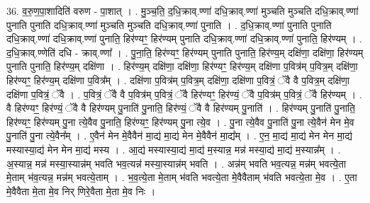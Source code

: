 \documentclass[17pt]{extarticle}
\begin{document}
36. व॒रु॒ण॒पा॒शादिति॑ वरुण - पा॒शात् । . मु॒ञ्च॒ति॒ द॒धि॒क्राव्.ण्णा॑ दधि॒क्राव्.ण्णा॑ मुञ्चति मुञ्चति दधि॒क्राव्.ण्णा॑ पुनाति पुनाति दधि॒क्राव्.ण्णा॑ मुञ्चति मुञ्चति दधि॒क्राव्.ण्णा॑ पुनाति । . द॒धि॒क्राव्.ण्णा॑ पुनाति पुनाति दधि॒क्राव्.ण्णा॑ दधि॒क्राव्.ण्णा॑ पुनाति॒ हिर॑ण्यꣳ॒॒ हिर॑ण्यम् पुनाति दधि॒क्राव्.ण्णा॑ दधि॒क्राव्.ण्णा॑ पुनाति॒ हिर॑ण्यम् । . द॒धि॒क्राव्.ण्णेति॑ दधि - क्राव्.ण्णा᳚ । . पु॒ना॒ति॒ हिर॑ण्यꣳ॒॒ हिर॑ण्यम् पुनाति पुनाति॒ हिर॑ण्य॒म् दक्षि॑णा॒ दक्षि॑णा॒ हिर॑ण्यम् पुनाति पुनाति॒ हिर॑ण्य॒म् दक्षि॑णा । . हिर॑ण्य॒म् दक्षि॑णा॒ दक्षि॑णा॒ हिर॑ण्यꣳ॒॒ हिर॑ण्य॒म् दक्षि॑णा प॒वित्र॑म् प॒वित्र॒म् दक्षि॑णा॒ हिर॑ण्यꣳ॒॒ हिर॑ण्य॒म् दक्षि॑णा प॒वित्र᳚म् । . दक्षि॑णा प॒वित्र॑म् प॒वित्र॒म् दक्षि॑णा॒ दक्षि॑णा प॒वित्रं॒ ॅवै वै प॒वित्र॒म् दक्षि॑णा॒ दक्षि॑णा प॒वित्रं॒ ॅवै । . प॒वित्रं॒ ॅवै वै प॒वित्र॑म् प॒वित्रं॒ ॅवै हिर॑ण्यꣳ॒॒ हिर॑ण्यं॒ ॅवै प॒वित्र॑म् प॒वित्रं॒ ॅवै हिर॑ण्यम् । . वै हिर॑ण्यꣳ॒॒ हिर॑ण्यं॒ ॅवै वै हिर॑ण्यम् पु॒नाति॑ पु॒नाति॒ हिर॑ण्यं॒ ॅवै वै हिर॑ण्यम् पु॒नाति॑ । . हिर॑ण्यम् पु॒नाति॑ पु॒नाति॒ हिर॑ण्यꣳ॒॒ हिर॑ण्यम् पु॒ना त्ये॒वैव पु॒नाति॒ हिर॑ण्यꣳ॒॒ हिर॑ण्यम् पु॒ना त्ये॒व । . पु॒ना त्ये॒वैव पु॒नाति॑ पु॒ना त्ये॒वैन॑ मेन मे॒व पु॒नाति॑ पु॒ना त्ये॒वैन᳚म् । . ए॒वैन॑ मेन मे॒वैवैन॑ मा॒द्य॑ मा॒द्य॑ मेन मे॒वैवैन॑ मा॒द्य᳚म् । . ए॒न॒ मा॒द्य॑ मा॒द्य॑ मेन मेन मा॒द्य॑ मस्यास्या॒द्य॑ मेन मेन मा॒द्य॑ मस्य । . आ॒द्य॑ मस्यास्या॒द्य॑ मा॒द्य॑ म॒स्यान्न॒ मन्न॑ मस्या॒द्य॑ मा॒द्य॑ म॒स्यान्न᳚म् । . अ॒स्यान्न॒ मन्न॑ मस्या॒स्यान्न॑म् भवति भव॒त्यन्न॑ मस्या॒स्यान्न॑म् भवति । . अन्न॑म् भवति भव॒त्यन्न॒ मन्न॑म् भवत्ये॒ता मे॒ताम् भ॑व॒त्यन्न॒ मन्न॑म् भवत्ये॒ताम् । . भ॒व॒त्ये॒ता मे॒ताम् भ॑वति भवत्ये॒ता मे॒वैवैताम् भ॑वति भवत्ये॒ता मे॒व । . ए॒ता मे॒वैवैता मे॒ता मे॒व निर् णिरे॒वैता मे॒ता मे॒व निः । \newline
\end{document}
